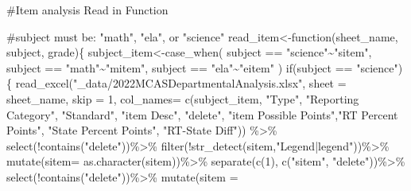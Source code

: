 \documentclass[
  letterpaper,
  DIV=11,
  numbers=noendperiod]{scrartcl}
\newenvironment{Shaded}{\begin{snugshade}}{\end{snugshade}}
\newcommand{\AttributeTok}[1]{\textcolor[rgb]{0.40,0.45,0.13}{#1}}
\newcommand{\CommentTok}[1]{\textcolor[rgb]{0.37,0.37,0.37}{#1}}
\newcommand{\ControlFlowTok}[1]{\textcolor[rgb]{0.00,0.23,0.31}{#1}}
\newcommand{\DecValTok}[1]{\textcolor[rgb]{0.68,0.00,0.00}{#1}}
\newcommand{\FunctionTok}[1]{\textcolor[rgb]{0.28,0.35,0.67}{#1}}
\newcommand{\NormalTok}[1]{\textcolor[rgb]{0.00,0.23,0.31}{#1}}
\newcommand{\OtherTok}[1]{\textcolor[rgb]{0.00,0.23,0.31}{#1}}
\newcommand{\SpecialCharTok}[1]{\textcolor[rgb]{0.37,0.37,0.37}{#1}}
\newcommand{\StringTok}[1]{\textcolor[rgb]{0.13,0.47,0.30}{#1}}
\begin{document}
\begin{Shaded}
\begin{Highlighting}[]
\CommentTok{\#Item analysis Read in Function}

\CommentTok{\#subject must be: "math", "ela", or "science"}
\NormalTok{read\_item}\OtherTok{\textless{}{-}}\ControlFlowTok{function}\NormalTok{(sheet\_name, subject, grade)\{}
\NormalTok{  subject\_item}\OtherTok{\textless{}{-}}\FunctionTok{case\_when}\NormalTok{(}
\NormalTok{    subject }\SpecialCharTok{==} \StringTok{"science"}\SpecialCharTok{\textasciitilde{}}\StringTok{"sitem"}\NormalTok{,}
\NormalTok{    subject }\SpecialCharTok{==} \StringTok{"math"}\SpecialCharTok{\textasciitilde{}}\StringTok{"mitem"}\NormalTok{,}
\NormalTok{    subject }\SpecialCharTok{==} \StringTok{"ela"}\SpecialCharTok{\textasciitilde{}}\StringTok{"eitem"}
\NormalTok{  )}
  \ControlFlowTok{if}\NormalTok{(subject }\SpecialCharTok{==} \StringTok{"science"}\NormalTok{)\{}
  \FunctionTok{read\_excel}\NormalTok{(}\StringTok{"\_data/2022MCASDepartmentalAnalysis.xlsx"}\NormalTok{, }\AttributeTok{sheet =}\NormalTok{ sheet\_name, }
             \AttributeTok{skip =} \DecValTok{1}\NormalTok{, }\AttributeTok{col\_names=} \FunctionTok{c}\NormalTok{(subject\_item, }\StringTok{"Type"}\NormalTok{, }\StringTok{"Reporting Category"}\NormalTok{, }\StringTok{"Standard"}\NormalTok{, }\StringTok{"item Desc"}\NormalTok{, }\StringTok{"delete"}\NormalTok{, }\StringTok{"item Possible Points"}\NormalTok{,}\StringTok{"RT Percent Points"}\NormalTok{, }\StringTok{"State Percent Points"}\NormalTok{, }\StringTok{"RT{-}State Diff"}\NormalTok{)) }\SpecialCharTok{\%\textgreater{}\%}
                  \FunctionTok{select}\NormalTok{(}\SpecialCharTok{!}\FunctionTok{contains}\NormalTok{(}\StringTok{"delete"}\NormalTok{))}\SpecialCharTok{\%\textgreater{}\%}
                  \FunctionTok{filter}\NormalTok{(}\SpecialCharTok{!}\FunctionTok{str\_detect}\NormalTok{(sitem,}\StringTok{"Legend|legend"}\NormalTok{))}\SpecialCharTok{\%\textgreater{}\%}
    \FunctionTok{mutate}\NormalTok{(}\AttributeTok{sitem=} \FunctionTok{as.character}\NormalTok{(sitem))}\SpecialCharTok{\%\textgreater{}\%}
    \FunctionTok{separate}\NormalTok{(}\FunctionTok{c}\NormalTok{(}\DecValTok{1}\NormalTok{), }\FunctionTok{c}\NormalTok{(}\StringTok{"sitem"}\NormalTok{, }\StringTok{"delete"}\NormalTok{))}\SpecialCharTok{\%\textgreater{}\%}
  \FunctionTok{select}\NormalTok{(}\SpecialCharTok{!}\FunctionTok{contains}\NormalTok{(}\StringTok{"delete"}\NormalTok{))}\SpecialCharTok{\%\textgreater{}\%}
   \FunctionTok{mutate}\NormalTok{(}\AttributeTok{sitem =}

\end{Highlighting}
\end{Shaded}
\end{document}
